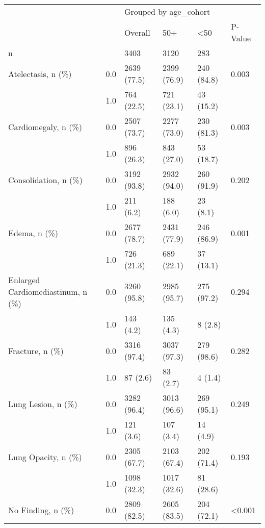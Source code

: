 \begin{tabular}{llllll}
\toprule
                       &     & \multicolumn{4}{l}{Grouped by age\_cohort} \\
                       &     &               Overall &          50+ &         <50 & P-Value \\
\midrule
n & {} &                  3403 &         3120 &         283 &         \\
Atelectasis, n (\%) & 0.0 &           2639 (77.5) &  2399 (76.9) &  240 (84.8) &   0.003 \\
                       & 1.0 &            764 (22.5) &   721 (23.1) &   43 (15.2) &         \\
Cardiomegaly, n (\%) & 0.0 &           2507 (73.7) &  2277 (73.0) &  230 (81.3) &   0.003 \\
                       & 1.0 &            896 (26.3) &   843 (27.0) &   53 (18.7) &         \\
Consolidation, n (\%) & 0.0 &           3192 (93.8) &  2932 (94.0) &  260 (91.9) &   0.202 \\
                       & 1.0 &             211 (6.2) &    188 (6.0) &    23 (8.1) &         \\
Edema, n (\%) & 0.0 &           2677 (78.7) &  2431 (77.9) &  246 (86.9) &   0.001 \\
                       & 1.0 &            726 (21.3) &   689 (22.1) &   37 (13.1) &         \\
Enlarged Cardiomediastinum, n (\%) & 0.0 &           3260 (95.8) &  2985 (95.7) &  275 (97.2) &   0.294 \\
                       & 1.0 &             143 (4.2) &    135 (4.3) &     8 (2.8) &         \\
Fracture, n (\%) & 0.0 &           3316 (97.4) &  3037 (97.3) &  279 (98.6) &   0.282 \\
                       & 1.0 &              87 (2.6) &     83 (2.7) &     4 (1.4) &         \\
Lung Lesion, n (\%) & 0.0 &           3282 (96.4) &  3013 (96.6) &  269 (95.1) &   0.249 \\
                       & 1.0 &             121 (3.6) &    107 (3.4) &    14 (4.9) &         \\
Lung Opacity, n (\%) & 0.0 &           2305 (67.7) &  2103 (67.4) &  202 (71.4) &   0.193 \\
                       & 1.0 &           1098 (32.3) &  1017 (32.6) &   81 (28.6) &         \\
No Finding, n (\%) & 0.0 &           2809 (82.5) &  2605 (83.5) &  204 (72.1) &  <0.001 \\

\end{tabular}
